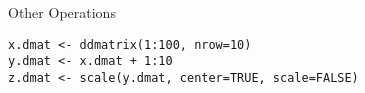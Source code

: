 \begin{frame}[fragile]
  \begin{exampleblock}{Other Operations}\pause
\begin{lstlisting}
x.dmat <- ddmatrix(1:100, nrow=10)
y.dmat <- x.dmat + 1:10
z.dmat <- scale(y.dmat, center=TRUE, scale=FALSE)
\end{lstlisting}
  \end{exampleblock}
\end{frame}



% 
% 
% 
% 
% 
% 
% 
% 
% 
% 
% 
% 
% 
